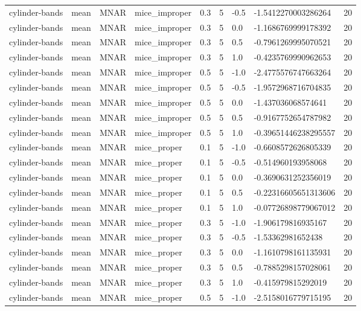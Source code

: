 \begin{tabular}{lllllllll}
cylinder-bands & mean & MNAR & mice\_improper & 0.3 & 5 & -0.5 & -1.5412270003286264 & 20 \\
cylinder-bands & mean & MNAR & mice\_improper & 0.3 & 5 & 0.0 & -1.1686769999178392 & 20 \\
cylinder-bands & mean & MNAR & mice\_improper & 0.3 & 5 & 0.5 & -0.7961269995070521 & 20 \\
cylinder-bands & mean & MNAR & mice\_improper & 0.3 & 5 & 1.0 & -0.4235769990962653 & 20 \\
cylinder-bands & mean & MNAR & mice\_improper & 0.5 & 5 & -1.0 & -2.4775576747663264 & 20 \\
cylinder-bands & mean & MNAR & mice\_improper & 0.5 & 5 & -0.5 & -1.9572968716704835 & 20 \\
cylinder-bands & mean & MNAR & mice\_improper & 0.5 & 5 & 0.0 & -1.437036068574641 & 20 \\
cylinder-bands & mean & MNAR & mice\_improper & 0.5 & 5 & 0.5 & -0.9167752654787982 & 20 \\
cylinder-bands & mean & MNAR & mice\_improper & 0.5 & 5 & 1.0 & -0.39651446238295557 & 20 \\
cylinder-bands & mean & MNAR & mice\_proper & 0.1 & 5 & -1.0 & -0.6608572626805339 & 20 \\
cylinder-bands & mean & MNAR & mice\_proper & 0.1 & 5 & -0.5 & -0.514960193958068 & 20 \\
cylinder-bands & mean & MNAR & mice\_proper & 0.1 & 5 & 0.0 & -0.3690631252356019 & 20 \\
cylinder-bands & mean & MNAR & mice\_proper & 0.1 & 5 & 0.5 & -0.22316605651313606 & 20 \\
cylinder-bands & mean & MNAR & mice\_proper & 0.1 & 5 & 1.0 & -0.07726898779067012 & 20 \\
cylinder-bands & mean & MNAR & mice\_proper & 0.3 & 5 & -1.0 & -1.906179816935167 & 20 \\
cylinder-bands & mean & MNAR & mice\_proper & 0.3 & 5 & -0.5 & -1.53362981652438 & 20 \\
cylinder-bands & mean & MNAR & mice\_proper & 0.3 & 5 & 0.0 & -1.1610798161135931 & 20 \\
cylinder-bands & mean & MNAR & mice\_proper & 0.3 & 5 & 0.5 & -0.7885298157028061 & 20 \\
cylinder-bands & mean & MNAR & mice\_proper & 0.3 & 5 & 1.0 & -0.415979815292019 & 20 \\
cylinder-bands & mean & MNAR & mice\_proper & 0.5 & 5 & -1.0 & -2.5158016779715195 & 20 \\

\end{tabular}
